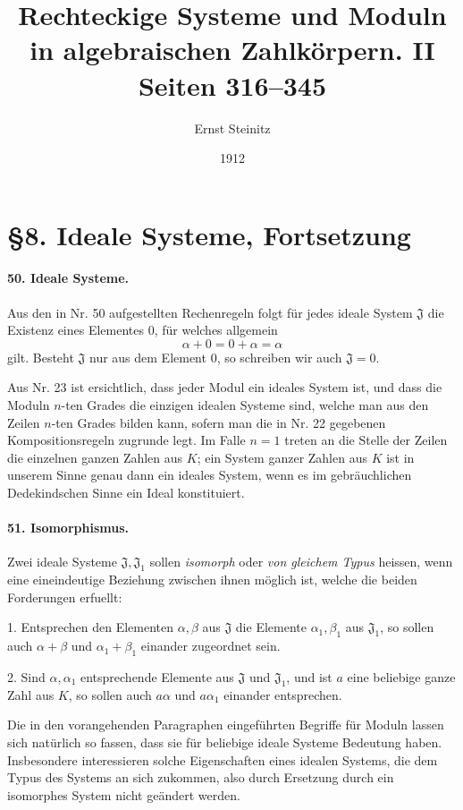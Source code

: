 \documentclass[11pt]{article}
\title{Rechteckige Systeme und Moduln in algebraischen Zahlk\"orpern. II\\\large Seiten 316--345}
\author{Ernst Steinitz}
\date{1912}
\begin{document}
\maketitle

\section*{\S 8. Ideale Systeme, Fortsetzung}

\paragraph{50. Ideale Systeme.}
Aus den in Nr. 50 aufgestellten Rechenregeln folgt für jedes ideale System $\mathfrak J$ die Existenz eines Elementes $0$, für welches allgemein
\[
  \alpha+0=0+\alpha=\alpha
\]
gilt. Besteht $\mathfrak J$ nur aus dem Element $0$, so schreiben wir auch $\mathfrak J=0$.

Aus Nr. 23 ist ersichtlich, dass jeder Modul ein ideales System ist, und dass die Moduln $n$-ten Grades die einzigen idealen Systeme sind, welche man aus den Zeilen $n$-ten Grades bilden kann, sofern man die in Nr. 22 gegebenen Kompositionsregeln zugrunde legt. Im Falle $n=1$ treten an die Stelle der Zeilen die einzelnen ganzen Zahlen aus $K$; ein System ganzer Zahlen aus $K$ ist in unserem Sinne genau dann ein ideales System, wenn es im gebräuchlichen Dedekindschen Sinne ein Ideal konstituiert.

\paragraph{51. Isomorphismus.}
Zwei ideale Systeme $\mathfrak J,\mathfrak J_1$ sollen \emph{isomorph} oder \emph{von gleichem Typus} heissen, wenn eine eineindeutige Beziehung zwischen ihnen möglich ist, welche die beiden Forderungen erfuellt:

1. Entsprechen den Elementen $\alpha,\beta$ aus $\mathfrak J$ die Elemente $\alpha_1,\beta_1$ aus $\mathfrak J_1$, so sollen auch $\alpha+\beta$ und $\alpha_1+\beta_1$ einander zugeordnet sein.

2. Sind $\alpha,\alpha_1$ entsprechende Elemente aus $\mathfrak J$ und $\mathfrak J_1$, und ist $a$ eine beliebige ganze Zahl aus $K$, so sollen auch $a\alpha$ und $a\alpha_1$ einander entsprechen.

Die in den vorangehenden Paragraphen eingeführten Begriffe für Moduln lassen sich natürlich so fassen, dass sie für beliebige ideale Systeme Bedeutung haben. Insbesondere interessieren solche Eigenschaften eines idealen Systems, die dem Typus des Systems an sich zukommen, also durch Ersetzung durch ein isomorphes System nicht geändert werden.
\end{document}
